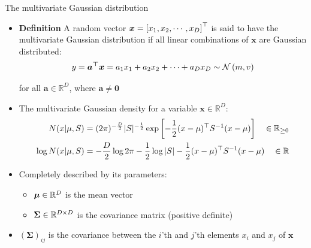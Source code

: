 \begin{frame}{The multivariate Gaussian distribution}
\begin{itemize}
	\setlength{\itemsep}{4mm}
	\item {\bf Definition} A random vector $\bm{x} = \left[x_1, x_2, \cdots, x_D\right]^\top$ is said to have the multivariate Gaussian distribution if all linear combinations of $\bm{x}$ are Gaussian distributed:
	\begin{align}
		y = \bm{a^\top}\bm{x} = a_1x_1 + a_2x_2 + \cdots + a_D x_D \sim \mathcal{N}\left(m, v\right)
	\end{align}

	for all $\bm{a} \in \mathbb{R}^D$, where $\bm{a} \neq \bm{0}$

    \pause

	\item The multivariate Gaussian density for a variable $\bm{x} \in \mathbb{R}^D$:
	\begin{align}
		N(x | \mu, S ) &= (2\pi)^{-\frac{D}{2}} | S |^{-\frac{1}{2}} \exp\left[-\frac12(x - \mu)^\top S^{-1} (x - \mu) \right] \quad \in \mathbb{R}_{\ge 0} \\   
		\log N(x | \mu, S ) &= -\frac{D}{2} \log 2\pi - \frac{1}{2} \log | S | -\frac{1}{2} (x - \mu)^\top S^{-1} (x - \mu) \quad \in \mathbb{R}
	\end{align}

    \pause

	\item Completely described by its parameters:
	\vspace*{2mm}
	\begin{itemize}
		\setlength{\itemsep}{4mm}
		\item $\bm{\mu} \in \mathbb{R}^D$ is the mean vector
		\item $\bm{\Sigma} \in \mathbb{R}^{D\times D}$ is the covariance matrix (positive definite)
	\end{itemize}
	
	\pause
	
	\item $\left( \bm{\Sigma}\right)_{ij}$ is the covariance between the $i$'th and $j$'th elements $x_i$ and $x_j$ of $\bm{x}$
	
\end{itemize}
\end{frame}


